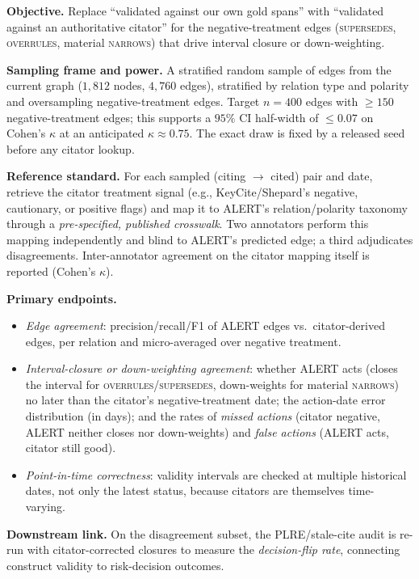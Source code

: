 \textbf{Objective.} Replace ``validated against our own gold spans'' with ``validated against an authoritative citator'' for the negative-treatment edges (\textsc{supersedes}, \textsc{overrules}, material \textsc{narrows}) that drive interval closure or down-weighting.

\textbf{Sampling frame and power.} A stratified random sample of edges from the current graph ($1{,}812$ nodes, $4{,}760$ edges), stratified by relation type and polarity and oversampling negative-treatment edges. Target $n\!=\!400$ edges with $\ge\!150$ negative-treatment edges; this supports a $95\%$ CI half-width of $\le\!0.07$ on Cohen's $\kappa$ at an anticipated $\kappa\!\approx\!0.75$. The exact draw is fixed by a released seed before any citator lookup.

\textbf{Reference standard.} For each sampled (citing $\rightarrow$ cited) pair and date, retrieve the citator treatment signal (e.g., KeyCite/Shepard's negative, cautionary, or positive flags) and map it to ALERT's relation/polarity taxonomy through a \emph{pre-specified, published crosswalk}. Two annotators perform this mapping independently and blind to ALERT's predicted edge; a third adjudicates disagreements. Inter-annotator agreement on the citator mapping itself is reported (Cohen's $\kappa$).

\textbf{Primary endpoints.}
\begin{itemize}[leftmargin=1.2em,itemsep=1pt,topsep=2pt]
  \item \emph{Edge agreement}: precision/recall/F1 of ALERT edges vs.\ citator-derived edges, per relation and micro-averaged over negative treatment.
  \item \emph{Interval-closure or down-weighting agreement}: whether ALERT acts (closes the interval for \textsc{overrules}/\textsc{supersedes}, down-weights for material \textsc{narrows}) no later than the citator's negative-treatment date; the action-date error distribution (in days); and the rates of \emph{missed actions} (citator negative, ALERT neither closes nor down-weights) and \emph{false actions} (ALERT acts, citator still good).
  \item \emph{Point-in-time correctness}: validity intervals are checked at multiple historical dates, not only the latest status, because citators are themselves time-varying.
\end{itemize}

\textbf{Downstream link.} On the disagreement subset, the PLRE/stale-cite audit is re-run with citator-corrected closures to measure the \emph{decision-flip rate}, connecting construct validity to risk-decision outcomes.

